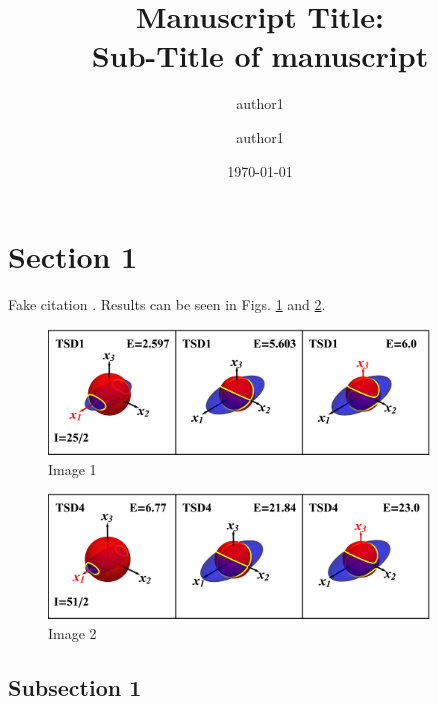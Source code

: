 \documentclass[%
 reprint,
 amsmath,
 amssymb,
 aps,
]{revtex4-2}
\begin{document}
\title{Manuscript Title:\\Sub-Title of manuscript }%

\author{author1}%
\author{author1}%
%


\date{\today}

\begin{abstract}
\lipsum[1]
\end{abstract}

\maketitle


\section{Section 1}

\lipsum[1-4] Fake citation \cite{chen2020interpretation}. Results can be seen in Figs. \ref{fig:image-1} and \ref{fig:image-2}.

\begin{figure}
    \centering
    \includegraphics[width=0.9\textwidth]{images/energy_ellipsoids/tsd1_spin1.eps}
    \caption{Image 1}
    \label{fig:image-1}
\end{figure}

\begin{figure}
    \centering
    \includegraphics[width=0.9\textwidth]{images/energy_ellipsoids/tsd4_spin2.eps}
    \caption{Image 2}
    \label{fig:image-2}
\end{figure}

\subsection{Subsection 1}

\lipsum[1-4]



\end{document}
